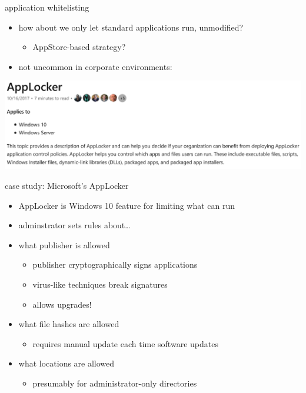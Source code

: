 \begin{frame}{application whitelisting}
\begin{itemize}
\item how about we only let standard applications run, unmodified?
    \begin{itemize}
    \item AppStore-based strategy?
    \end{itemize}
\item not uncommon in corporate environments:
\end{itemize}
\vspace{.5cm}
\includegraphics[width=\textwidth]{../heur-detect/applocker-manual}
\end{frame}

\begin{frame}{case study: Microsoft's AppLocker}
    \begin{itemize}
    \item AppLocker is Windows 10 feature for limiting what can run
    \vspace{.5cm}
    \item adminstrator sets rules about\ldots
    \item what publisher is allowed
        \begin{itemize}
        \item publisher cryptographically signs applications
        \item virus-like techniques break signatures
        \item allows upgrades!
        \end{itemize}
    \item what file hashes are allowed
        \begin{itemize}
        \item requires manual update each time software updates
        \end{itemize}
    \item what locations are allowed
        \begin{itemize}
        \item presumably for administrator-only directories
        \end{itemize}
    \end{itemize}
\end{frame}

